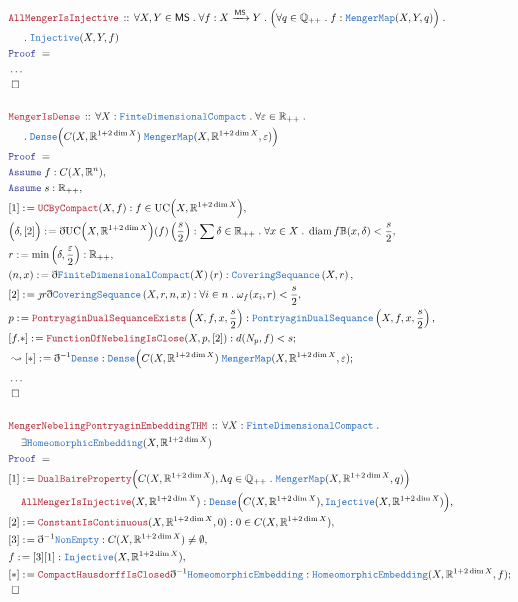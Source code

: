 \documentclass[12pt]{scrartcl}
\newcommand{\TYPE}[1]{\textcolor{NavyBlue}{\mathtt{#1}}}
\newcommand{\LOGIC}[1]{\textcolor{Blue}{\mathtt{#1}}}
\newcommand{\THM}[1]{\textcolor{Maroon}{\mathtt{#1}}}
\renewcommand{\.}{\; . \;}
\newcommand{\de}{: \kern 0.1pc =}
\newcommand{\Act}[1]{\left( #1 \right)}
\newcommand{\Theorem}[2]{& \THM{#1} \, :: \, #2 \\ & \Proof = \\ }
\newcommand{\NewLine}{\\ & \kern 1pc}
\newcommand{\Page}[1]{ \begin{align*} #1 \end{align*}   }
\newcommand{ \bd }{ \ByDef }
\newcommand{\NoProof}{ & \ldots \\ \EndProof}
\newcommand{\Reals}{\mathbb{R} }
\newcommand{\Rats}{\mathbb{Q} }
\newcommand{\Arrow}{\xrightarrow}
\newcommand{\Say}[3]{& #1 \de #2 : #3, \\}
\newcommand{\Conclude}[3]{& #1 \de #2 : #3; \\}
\newcommand{\DeriveConclude}[3]{& \leadsto #1 \de #2 : #3 ; \\}
\newcommand{\Assume}[2]{& \LOGIC{Assume} \; #1 : #2, \\}
\newcommand{\QED}{\; \square}
\newcommand{\EndProof}{& \QED \\}
\newcommand{\ByDef}{\eth}
\newcommand{\ByConstr}{\jmath}
\newcommand{\Proof}{\LOGIC{Proof} \; }
\DeclareMathOperator{\diam}{diam}
\newcommand{\MS}{\mathsf{MS}}
\begin{document}
\Page{
	\Theorem{AllMengerIsInjective}{\forall X,Y \in \MS \. \forall f : X \Arrow{\MS} Y \. \Big( \forall q \in \Rats_{++} \. f : \TYPE{MengerMap}(X,Y,q)\Big) \.  \NewLine \. \TYPE{Injective}(X,Y,f) }
	\NoProof
	\\
	\Theorem{MengerIsDense}{\forall X :  \TYPE{FinteDimensionalCompact} \.    \forall \varepsilon \in \Reals_{++} \. \NewLine \. \TYPE{Dense}\Big( C(X,\Reals^{1 + 2\dim X}) \; \TYPE{MengerMap}(X,\Reals^{1 + 2\dim X},\varepsilon)   \Big)}
	\Assume{f}{C(X,\Reals^n)}
	\Assume{s}{\Reals_{++}}
	\Say{[1]}{\THM{UCByCompact}(X,f)}{f \in \mathrm{UC}\Big(X, \Reals^{1 + 2\dim X}\Big)}
	\Say{\Big( \delta, [2] \Big)}{\bd  \mathrm{UC}\Big(X, \Reals^{1 + 2\dim X}\Big)(f)\Act{\frac{s}{2}}}
	{
		\sum \delta \in \Reals_{++} \. \forall x \in X \. \diam f\mathbb{B}(x,\delta) < \frac{s}{2}
	}
	\Say{r}{\min\Act{\delta, \frac{\varepsilon}{2}}}{\Reals_{++}}
	\Say{(n,x)}{\bd \TYPE{FiniteDimensionalCompact}(X)\Act{r}}{\TYPE{CoveringSequance}\Act{X,r}}
	\Say{[2]}{\ByConstr r \bd \TYPE{CoveringSequance}\Act{X,r,n,x} }{\forall i \in n \.  \omega_f(x_i, r) < \frac{s}{2} }
	\Say{p}{\THM{PontryaginDualSequanceExists}\Act{X,f,x,\frac{s}{2}}}{\TYPE{PontryaginDualSequance}\Act{X,f,x,\frac{s}{2}}}
	\Conclude{[f.*]}{\THM{FunctionOfNebelingIsClose}(X,p,[2])}{ d(N_p,f) < s }
	\DeriveConclude{[*]}{\bd^{-1} \TYPE{Dense}}{   \TYPE{Dense}\Big( C(X,\Reals^{1 + 2\dim X}) \; \TYPE{MengerMap}(X,\Reals^{1 + 2\dim X},\varepsilon)   }
	\NoProof
	\\
	\Theorem{MengerNebelingPontryaginEmbeddingTHM}{\forall X :  \TYPE{FinteDimensionalCompact} \. \NewLine  \exists \TYPE{HomeomorphicEmbedding}(X,\Reals^{1 + 2\dim X} ) }
	\Say{[1]}{\THM{DualBaireProperty}\Big(  C(X,\Reals^{1 + 2\dim X}), \Lambda q \in \Rats_{++} \. \TYPE{MengerMap}(X,\Reals^{1 + 2\dim X},q)  \Big) \NewLine \THM{AllMengerIsInjective}(X,\Reals^{1 + 2\dim X})}
	{
		\TYPE{Dense}\Big(  C(X,\Reals^{1 + 2\dim X})  ,\TYPE{Injective}(X,\Reals^{1 + 2\dim X}) \Big)
	}
	\Say{[2]}{\THM{ConstantIsContinuous}(X,\Reals^{1 + 2\dim X},0)}{0 \in  C(X,\Reals^{1 + 2\dim X}) }
	\Say{[3]}{\bd^{-1} \TYPE{NonEmpty}}{C(X,\Reals^{1 + 2\dim X}) \neq \emptyset}
	\Say{f}{[3][1]}{\TYPE{Injective}(X,\Reals^{1 + 2\dim X})}
	\Conclude{[*]}{\THM{CompactHausdorffIsClosed}\bd^{-1} \TYPE{HomeomorphicEmbedding}}{\TYPE{HomeomorphicEmbedding}(X,\Reals^{1 + 2\dim X},f )}
	\EndProof 
}
\end{document}
